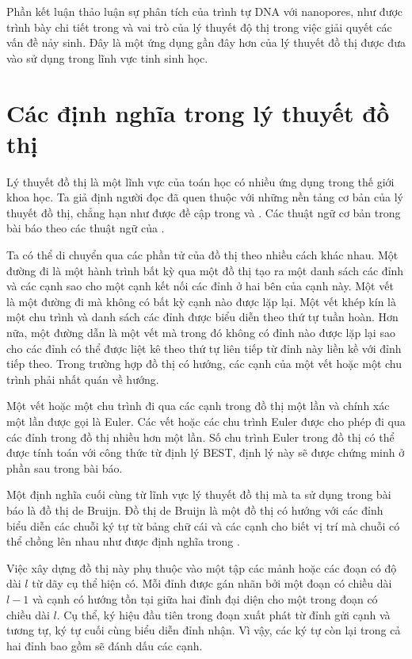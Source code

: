 \documentclass[14pt, a4paper]{article}
\numberwithin{equation}{section}
\numberwithin{figure}{section}
\numberwithin{dl}{section}
\numberwithin{md}{section}
\numberwithin{bd}{section}
\numberwithin{dn}{section}
\numberwithin{hq}{section}
\begin{document}
    Phần kết luận thảo luận sự phân tích của trình tự DNA với nanopores, như được trình bày chi tiết trong \cite{bokhari2005parallel} và vai trò của lý thuyết độ thị trong việc giải quyết các vấn đề nảy sinh.
    Đây là một ứng dụng gần đây hơn của lý thuyết đồ thị được đưa vào sử dụng trong lĩnh vực tinh sinh học.
    
    \section{Các định nghĩa trong lý thuyết đồ thị}

    Lý thuyết đồ thị là một lĩnh vực của toán học có nhiều ứng dụng trong thế giới khoa học.
    Ta giả định người đọc đã quen thuộc với những nền tảng cơ bản của lý thuyết đồ thị, chẳng hạn như được đề cập trong \cite{tucker2006applied} và \cite{west2001introduction}.
    Các thuật ngữ cơ bản trong bài báo theo các thuật ngữ của \cite{west2001introduction}.

    Ta có thể di chuyển qua các phần tử của đồ thị theo nhiều cách khác nhau.
    Một đường đi là một hành trình bất kỳ qua một đồ thị tạo ra một danh sách các đỉnh và các cạnh sao cho một cạnh kết nối các đỉnh ở hai bên của cạnh này.
    Một vết là một đường đi mà không có bất kỳ cạnh nào được lặp lại.
    Một vết khép kín là một chu trình và danh sách các đỉnh được biểu diễn theo thứ tự tuần hoàn.
    Hơn nữa, một đường dẫn là một vết mà trong đó không có đỉnh nào được lặp lại sao cho các đỉnh có thể được liệt kê theo thứ tự liên tiếp từ đỉnh này liền kề với đỉnh tiếp theo.
    Trong trường hợp đồ thị có hướng, các cạnh của một vết hoặc một chu trình phải nhất quán về hướng.

    Một vết hoặc một chu trình đi qua các cạnh trong đồ thị một lần và chính xác một lần được gọi là Euler.
    Các vết hoặc các chu trình Euler được cho phép đi qua các đỉnh trong đồ thị nhiều hơn một lần.
    Số chu trình Euler trong đồ thị có thể được tính toán với công thức từ định lý BEST, định lý này sẽ được chứng minh ở phần sau trong bài báo.

    Một định nghĩa cuối cùng từ lĩnh vực lý thuyết đồ thị mà ta sử dụng trong bài báo là đồ thị de Bruijn.
    Đồ thị de Bruijn là một đồ thị có hướng với các đỉnh biểu diễn các chuỗi ký tự từ bảng chữ cái và các cạnh cho biết vị trí mà chuỗi có thể chồng lên nhau như được định nghĩa trong \cite{de1946combinatorial}.

    Việc xây dựng đồ thị này phụ thuộc vào một tập các mảnh hoặc các đoạn có độ dài $l$ từ dãy cụ thể hiện có.
    Mỗi đỉnh được gán nhãn bởi một đoạn có chiều dài $l-1$ và cạnh có hướng tồn tại giữa hai đỉnh đại diện cho một trong đoạn có chiều dài $l$.
    Cụ thể, ký hiệu đầu tiên trong đoạn xuất phát từ đỉnh gửi cạnh và tương tự, ký tự cuối cùng biểu diễn đỉnh nhận.
    Vì vậy, các ký tự còn lại trong cả hai đỉnh bao gồm sẽ đánh dấu các cạnh.
\end{document}
